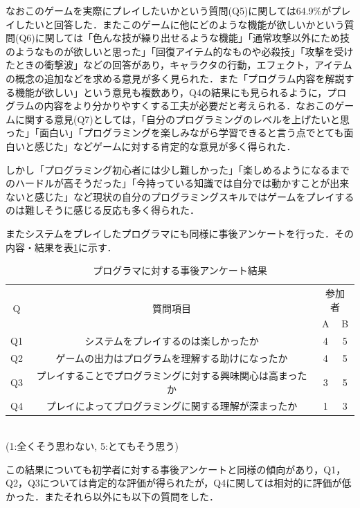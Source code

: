 なおこのゲームを実際にプレイしたいかという質問(Q5)に関しては64.9\%がプレイしたいと回答した．またこのゲームに他にどのような機能が欲しいかという質問(Q6)に関しては「色んな技が繰り出せるような機能」「通常攻撃以外にため技のようなものが欲しいと思った」「回復アイテム的なものや必殺技」「攻撃を受けたときの衝撃波」などの回答があり，キャラクタの行動，エフェクト，アイテムの概念の追加などを求める意見が多く見られた．また「プログラム内容を解説する機能が欲しい」という意見も複数あり，Q4の結果にも見られるように，プログラムの内容をより分かりやすくする工夫が必要だと考えられる．なおこのゲームに関する意見(Q7)としては，「自分のプログラミングのレベルを上げたいと思った」「面白い」「プログラミングを楽しみながら学習できると言う点でとても面白いと感じた」などゲームに対する肯定的な意見が多く得られた．

しかし「プログラミング初心者には少し難しかった」「楽しめるようになるまでのハードルが高そうだった」「今持っている知識では自分では動かすことが出来ないと感じた」など現状の自分のプログラミングスキルではゲームをプレイするのは難しそうに感じる反応も多く得られた．

またシステムをプレイしたプログラマにも同様に事後アンケートを行った．その内容・結果を表\ref{programmer_interview}に示す．

\begin{table}[!ht]
  \centering
  \caption{プログラマに対する事後アンケート結果}
  \label{programmer_interview}
    \begin{tabular}{|c|c|c|c|} \hline
      \multirow{2}{*}{Q} & \multirow{2}{*}{質問項目} & \multicolumn{2}{c}{参加者} \\ 
        & &A&B\\ \hline\hline
      Q1 & システムをプレイするのは楽しかったか & 4 & 5 \\ \hline
      Q2 & ゲームの出力はプログラムを理解する助けになったか & 4 & 5\\ \hline
      Q3 & プレイすることでプログラミングに対する興味関心は高まったか & 3 & 5\\ \hline
      Q4 & プレイによってプログラミングに関する理解が深まったか & 1 & 3\\ \hline
    \end{tabular}
    \\(1:全くそう思わない, 5:とてもそう思う)
\end{table}
この結果についても初学者に対する事後アンケートと同様の傾向があり，Q1，Q2，Q3については肯定的な評価が得られたが，Q4に関しては相対的に評価が低かった．またそれら以外にも以下の質問をした．

